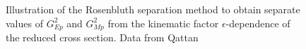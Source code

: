 \begin{figure}
\begin{center}
\caption{Illustration of the Rosenbluth separation method to obtain separate values of $G_{Ep}^2$ and $G_{Mp}^2$ from the kinematic factor 
$\epsilon$-dependence of the reduced cross section. Data from Qattan \cite{qattan05}}
\label{fig:geplt1}
\end{center}
\end{figure}

